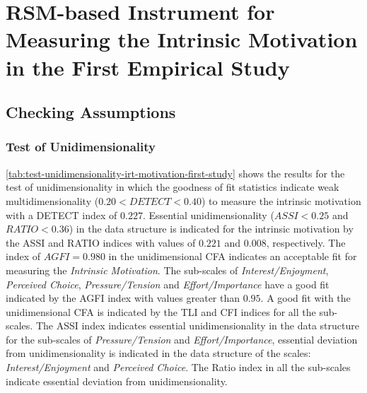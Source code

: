 \newpage
\section{RSM-based Instrument for Measuring the Intrinsic Motivation in the First Empirical Study}
\label{sec:irt-motivation-first-study}

\subsection{Checking Assumptions}

\subsubsection*{Test of Unidimensionality}

\autoref{tab:test-unidimensionality-irt-motivation-first-study} shows the results for the test of unidimensionality in which the goodness of fit statistics indicate weak multidimensionality ($0.20 < DETECT < 0.40$) to measure the intrinsic motivation with a DETECT index of $0.227$. Essential unidimensionality ($ASSI < 0.25$ and $RATIO < 0.36$) in the data structure is indicated for the intrinsic motivation by the ASSI and RATIO indices with values of $0.221$ and $0.008$, respectively. The index of $AGFI = 0.980$ in the unidimensional CFA indicates an acceptable fit for measuring the \emph{Intrinsic Motivation}. The sub-scales of \emph{Interest/Enjoyment}, \emph{Perceived Choice}, \emph{Pressure/Tension} and \emph{Effort/Importance} have a good fit indicated by the AGFI index with values greater than $0.95$. A good fit with the unidimensional CFA is indicated by the TLI and CFI indices for all the sub-scales. The ASSI index indicates essential unidimensionality in the data structure for the sub-scales of \emph{Pressure/Tension} and \emph{Effort/Importance}, essential deviation from unidimensionality is indicated in the data structure of the scales: \emph{Interest/Enjoyment} and \emph{Perceived Choice}. The Ratio index in all the sub-scales indicate essential deviation from unidimensionality.

